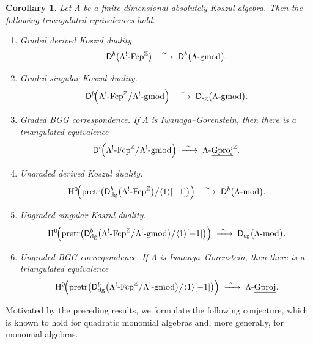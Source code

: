 \documentclass[11pt]{article}
\newtheorem{corollary}[theorem]{Corollary}
\theoremstyle{definition}
\theoremstyle{remark}
\begin{document}
\begin{corollary}
Let \(\Lambda\) be a finite-dimensional absolutely Koszul algebra. Then the following triangulated equivalences hold.

\begin{enumerate}\itemsep=0.4em

\item[\textup{(i)}] \emph{Graded derived Koszul duality.}
\[
\mathsf{D}^{b}\bigl(\Lambda^{!}\textup{-Fcp}^{\mathbb{Z}}\bigr)
\;\xrightarrow{\ \sim\ }\;
\mathsf{D}^{b}\bigl(\Lambda\textup{-gmod}\bigr).
\]

\item[\textup{(ii)}] \emph{Graded singular Koszul duality.}
\[
\mathsf{D}^{b}\!\Bigl(
\Lambda^{!}\textup{-Fcp}^{\mathbb{Z}} \big/ \Lambda^{!}\textup{-gmod}
\Bigr)
\;\xrightarrow{\ \sim\ }\;
\mathsf{D}_{\mathrm{sg}}\bigl(\Lambda\textup{-gmod}\bigr).
\]

\item[\textup{(iii)}] \emph{Graded BGG correspondence.}
If \(\Lambda\) is Iwanaga--Gorenstein, then there is a triangulated equivalence
\[
\mathsf{D}^{b}\!\Bigl(
\Lambda^{!}\textup{-Fcp}^{\mathbb{Z}} \big/ \Lambda^{!}\textup{-gmod}
\Bigr)
\;\xrightarrow{\ \sim\ }\;
\Lambda\textup{-}\underline{\mathrm{Gproj}}^{\mathbb{Z}}.
\]

\item[\textup{(iv)}] \emph{Ungraded derived Koszul duality.}
\[
\mathrm{H}^{0}\!\Bigl(
\operatorname{pretr}\bigl(
\mathsf{D}_{\mathrm{dg}}^{b}\bigl(\Lambda^{!}\textup{-Fcp}^{\mathbb{Z}}\bigr)
\big/ \langle 1 \rangle[-1]
\bigr)
\Bigr)
\;\xrightarrow{\ \sim\ }\;
\mathsf{D}^{b}\bigl(\Lambda\textup{-mod}\bigr).
\]

\item[\textup{(v)}] \emph{Ungraded singular Koszul duality.}
\[
\mathrm{H}^{0}\!\Bigl(
\operatorname{pretr}\bigl(
\mathsf{D}_{\mathrm{dg}}^{b}\bigl(
\Lambda^{!}\textup{-Fcp}^{\mathbb{Z}} \big/ \Lambda^{!}\textup{-gmod}
\bigr)
\big/ \langle 1 \rangle[-1]
\bigr)
\Bigr)
\;\xrightarrow{\ \sim\ }\;
\mathsf{D}_{\mathrm{sg}}\bigl(\Lambda\textup{-mod}\bigr).
\]

\item[\textup{(vi)}] \emph{Ungraded BGG correspondence.}
If \(\Lambda\) is Iwanaga--Gorenstein, then there is a triangulated equivalence
\[
\mathrm{H}^{0}\!\Bigl(
\operatorname{pretr}\bigl(
\mathsf{D}_{\mathrm{dg}}^{b}\bigl(
\Lambda^{!}\textup{-Fcp}^{\mathbb{Z}} \big/ \Lambda^{!}\textup{-gmod}
\bigr)
\big/ \langle 1 \rangle[-1]
\bigr)
\Bigr)
\;\xrightarrow{\ \sim\ }\;
\Lambda\textup{-}\underline{\mathrm{Gproj}}.
\]

\end{enumerate}
\end{corollary}
Motivated by the preceding results, we formulate the following conjecture, which is known to hold for quadratic monomial algebras and, more generally, for monomial algebras.
\end{document}

